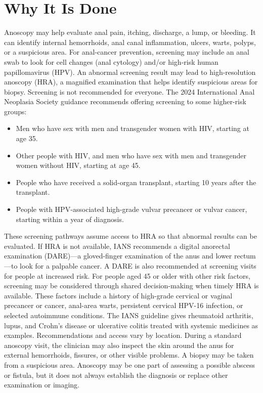 \section*{Why It Is Done}
Anoscopy may help evaluate anal pain, itching, discharge, a lump, or bleeding. It can identify internal hemorrhoids, anal canal inflammation, ulcers, warts, polyps, or a suspicious area. For anal-cancer prevention, screening may include an anal swab to look for cell changes (anal cytology) and/or high-risk human papillomavirus (HPV). An abnormal screening result may lead to high-resolution anoscopy (HRA), a magnified examination that helps identify suspicious areas for biopsy. Screening is not recommended for everyone. The 2024 International Anal Neoplasia Society guidance recommends offering screening to some higher-risk groups:
\begin{itemize}
  \item Men who have sex with men and transgender women with HIV, starting at age 35.
  \item Other people with HIV, and men who have sex with men and transgender women without HIV, starting at age 45.
  \item People who have received a solid-organ transplant, starting 10 years after the transplant.
  \item People with HPV-associated high-grade vulvar precancer or vulvar cancer, starting within a year of diagnosis.
\end{itemize}
These screening pathways assume access to HRA so that abnormal results can be evaluated. If HRA is not available, IANS recommends a digital anorectal examination (DARE)—a gloved-finger examination of the anus and lower rectum—to look for a palpable cancer. A DARE is also recommended at screening visits for people at increased risk.
For people aged 45 or older with other risk factors, screening may be considered through shared decision-making when timely HRA is available. These factors include a history of high-grade cervical or vaginal precancer or cancer, anal-area warts, persistent cervical HPV-16 infection, or selected autoimmune conditions. The IANS guideline gives rheumatoid arthritis, lupus, and Crohn's disease or ulcerative colitis treated with systemic medicines as examples. Recommendations and access vary by location. During a standard anoscopy visit, the clinician may also inspect the skin around the anus for external hemorrhoids, fissures, or other visible problems. A biopsy may be taken from a suspicious area. Anoscopy may be one part of assessing a possible abscess or fistula, but it does not always establish the diagnosis or replace other examination or imaging.

